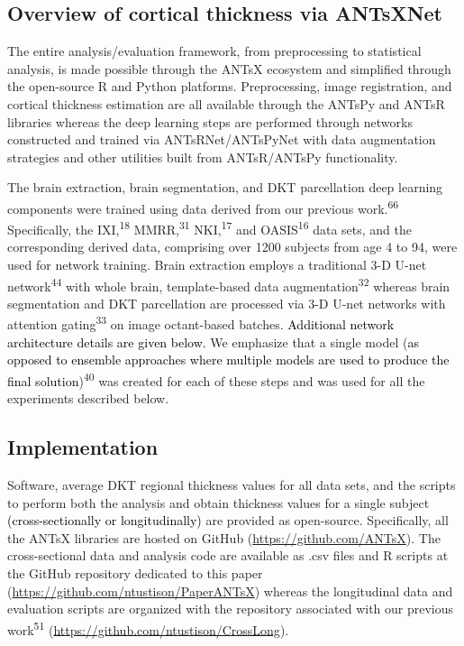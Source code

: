\documentclass[
  12pt,
]{article}
\begin{document}
\hypertarget{overview-of-cortical-thickness-via-antsxnet}{%
\subsection*{Overview of cortical thickness via
ANTsXNet}\label{overview-of-cortical-thickness-via-antsxnet}}

The entire analysis/evaluation framework, from preprocessing to
statistical analysis, is made possible through the ANTsX ecosystem and
simplified through the open-source R and Python platforms.
Preprocessing, image registration, and cortical thickness estimation are
all available through the ANTsPy and ANTsR libraries whereas the deep
learning steps are performed through networks constructed and trained
via ANTsRNet/ANTsPyNet with data augmentation strategies and other
utilities built from ANTsR/ANTsPy functionality.

The brain extraction, brain segmentation, and DKT parcellation deep
learning components were trained using data derived from our previous
work.\textsuperscript{66} Specifically, the IXI,\textsuperscript{18}
MMRR,\textsuperscript{31} NKI,\textsuperscript{17} and
OASIS\textsuperscript{16} data sets, and the corresponding derived data,
comprising over 1200 subjects from age 4 to 94, were used for network
training. Brain extraction employs a traditional 3-D U-net
network\textsuperscript{44} with whole brain, template-based data
augmentation\textsuperscript{32} whereas brain segmentation and DKT
parcellation are processed via 3-D U-net networks with attention
gating\textsuperscript{33} on image octant-based batches.
\textcolor{black}{Additional network architecture details are given below.}
We emphasize that a single model
(\textcolor{black}{as opposed to ensemble
approaches where multiple models are used to produce the final solution})\textsuperscript{40}
was created for each of these steps and was used for all the experiments
described below.

\hypertarget{implementation}{%
\subsection*{Implementation}\label{implementation}}

Software, average DKT regional thickness values for all data sets, and
the scripts to perform both the analysis and obtain thickness values for
a single subject
\textcolor{black}{(cross-sectionally or longitudinally)} are provided as
open-source. Specifically, all the ANTsX libraries are hosted on GitHub
(\url{https://github.com/ANTsX}). The cross-sectional data and analysis
code are available as .csv files and R scripts at the GitHub repository
dedicated to this paper (\url{https://github.com/ntustison/PaperANTsX})
whereas the longitudinal data and evaluation scripts are organized with
the repository associated with our previous work\textsuperscript{51}
(\url{https://github.com/ntustison/CrossLong}).
\end{document}
